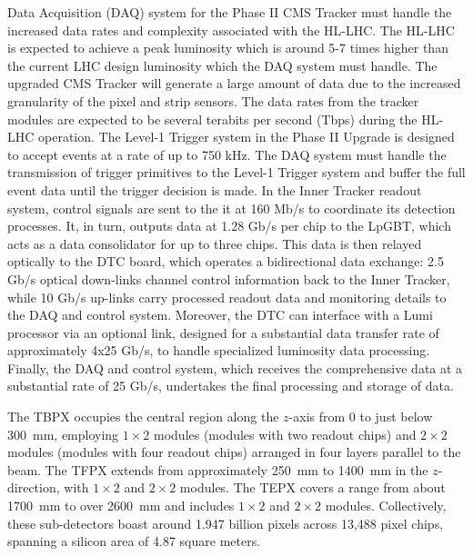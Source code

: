 Data Acquisition (DAQ) system for the Phase II CMS Tracker must handle the increased data rates and complexity associated with the HL-LHC. The HL-LHC is expected to achieve a peak luminosity which is around 5-7 times higher than the current LHC design luminosity which the DAQ system must handle. The upgraded CMS Tracker will generate a large amount of data due to the increased granularity of the pixel and strip sensors. The data rates from the tracker modules are expected to be several terabits per second (Tbps) during the HL-LHC operation. The Level-1 Trigger system in the Phase II Upgrade is designed to accept events at a rate of up to 750 kHz. The DAQ system must handle the transmission of trigger primitives to the Level-1 Trigger system and buffer the full event data until the trigger decision is made. %
In the Inner Tracker readout system, control signals are sent to the it at 160 Mb/s to coordinate its detection processes. It, in turn, outputs data at 1.28 Gb/s per chip to the LpGBT, which acts as a data consolidator for up to three chips. This data is then relayed optically to the DTC board, which operates a bidirectional data exchange: 2.5 Gb/s optical down-links channel control information back to the Inner Tracker, while 10 Gb/s up-links carry processed readout data and monitoring details to the DAQ and control system. Moreover, the DTC can interface with a Lumi processor via an optional link, designed for a substantial data transfer rate of approximately 4x25 Gb/s, to handle specialized luminosity data processing. Finally, the DAQ and control system, which receives the comprehensive data at a substantial rate of 25 Gb/s, undertakes the final processing and storage of data.


The TBPX occupies the central region along the \( z \)-axis from 0 to just below 300~mm, employing \( 1 \times 2 \) modules (modules with two readout chips) and \( 2 \times 2 \) modules (modules with four readout chips) arranged in four layers parallel to the beam. The TFPX extends from approximately 250~mm to 1400~mm in the \( z \)-direction, with \( 1 \times 2 \) and \( 2 \times 2 \) modules. The TEPX covers a range from about 1700~mm to over 2600~mm and includes  \( 1 \times 2 \) and \( 2 \times 2 \) modules. Collectively, these sub-detectors boast around 1.947 billion pixels across 13,488 pixel chips, spanning a silicon area of 4.87 square meters.

